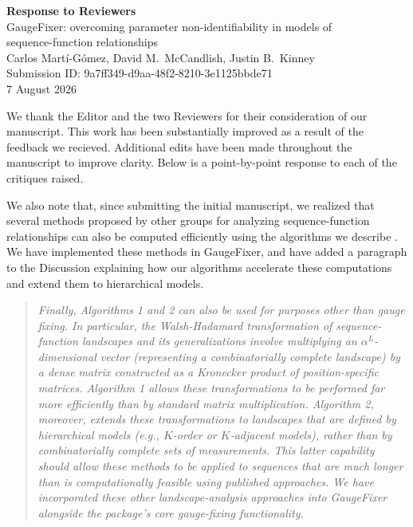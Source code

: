 \documentclass[11pt]{article}
\newenvironment{response}{\par\color{responseblue}}{\par}
\newenvironment{msquote}
  {\begin{quote}\color{responseblue}\itshape\noindent\ignorespaces}
  {\end{quote}}
\begin{document}
\begin{center}
{\Large\bfseries Response to Reviewers}\\[0.6em]
{\large GaugeFixer: overcoming parameter non-identifiability in models of\\
sequence-function relationships}\\[0.8em]
Carlos Mart\'{i}-G\'{o}mez, David M.\ McCandlish, Justin B.\ Kinney\\[0.5em]
Submission ID: 9a7ff349-d9aa-48f2-8210-3e1125bbde71\\
7 August 2026
\end{center}

\bigskip

\begin{response}
We thank the Editor and the two Reviewers for their consideration of our manuscript. This work has been substantially improved as a result of the feedback we recieved. Additional edits have been made throughout the manuscript to improve clarity. Below is a point-by-point response to each of the critiques raised. 

We also note that, since submitting the initial manuscript, we realized that several methods
proposed by other groups for analyzing sequence-function relationships can
also be computed efficiently using the algorithms we describe
\citep{Weinberger1991,Poelwijk2016,Stormo:2011jb,Brookes2022,Tsui2026,Faure:2024gy}.
We have implemented these methods in GaugeFixer, and have added a
paragraph to the Discussion explaining how our algorithms accelerate these
computations and extend them to hierarchical models.
\end{response}

\begin{msquote}
Finally, Algorithms 1 and 2 can also be used for purposes other than gauge
fixing. In particular, the Walsh-Hadamard transformation of sequence-function
landscapes \citep{Weinberger1991, Poelwijk2016} and its generalizations
\citep{Stormo:2011jb, Brookes2022, Tsui2026, Faure:2024gy} involve multiplying
an $\alpha^L$-dimensional vector (representing a combinatorially complete
landscape) by a dense matrix constructed as a Kronecker product of
position-specific matrices. Algorithm 1 allows these transformations to be
performed far more efficiently than by standard matrix multiplication.
Algorithm 2, moreover, extends these transformations to landscapes that are
defined by hierarchical models (e.g., $K$-order or $K$-adjacent models), rather
than by combinatorially complete sets of measurements. This latter capability
should allow these methods to be applied to sequences that are much longer than
is computationally feasible using published approaches. We have incorporated
these other landscape-analysis approaches into GaugeFixer alongside the
package's core gauge-fixing functionality.
\end{msquote}
\end{document}
